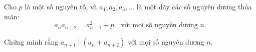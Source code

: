 \ifshowproblem
\begin{problem}\label{example:THA-2015-MO-P1}
    Cho \( p \) là một số nguyên tố, và \( a_1, a_2, a_3, \ldots \) là một dãy các số nguyên dương thỏa mãn:
    \[
        a_n a_{n+2} = a_{n+1}^2 + p \quad \text{với mọi số nguyên dương } n.
    \]
    
    Chứng minh rằng \( a_{n+1} \mid (a_n + a_{n+2}) \) với mọi số nguyên dương \( n \).
\end{problem}
\fi

\footnotemark
{}
\fi